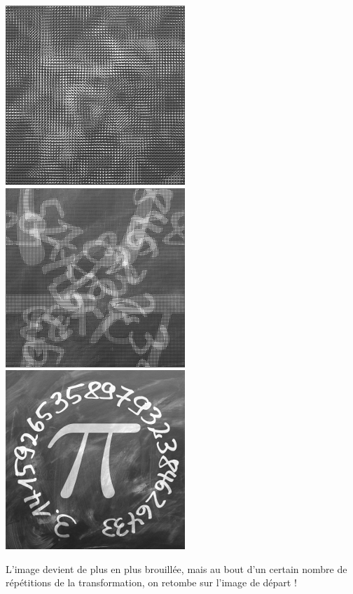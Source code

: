 \documentclass[11pt,class=report,crop=false]{standalone}
\begin{document}
\begin{cours}
\begin{center}
\includegraphics[scale=\myscale,scale=0.3]{images_fiche/pi_gimp_new_photo_6.png}\qquad
\includegraphics[scale=\myscale,scale=0.3]{images_fiche/pi_gimp_new_photo_7.png}\qquad
\includegraphics[scale=\myscale,scale=0.3]{images_fiche/pi_gimp_new_photo_8.png}
\end{center}
L'image devient de plus en plus brouillée, mais au bout d'un certain nombre de répétitions de la transformation, on retombe sur l'image de départ !
\end{cours}




\end{document}
